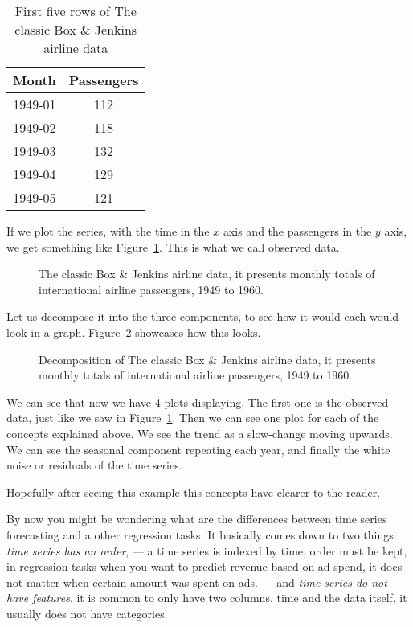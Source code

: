 \documentclass[journal]{IEEEtran}
\begin{document}
\begin{table}[htbp]
  \centering
  \caption{First five rows of The classic Box \& Jenkins airline data}
  \label{tab:passengerdata}
  \begin{tabular}{|c|c|}
    \hline
    Month    & Passengers \\
    \hline
    1949-01  & 112        \\
    1949-02  & 118        \\
    1949-03  & 132        \\
    1949-04  & 129        \\
    1949-05  & 121        \\
    \hline
  \end{tabular}
\end{table}

If we plot the series, with the time in the $x$ axis and the passengers in
the $y$ axis, we get something like Figure~\ref{fig:airpassenger}. This is
what we call observed data.

\begin{figure}[htbp]
  \centering
  
  \caption{The classic Box \& Jenkins airline data, it presents monthly
    totals of international airline passengers, 1949 to 1960.}
  \label{fig:airpassenger}
\end{figure}

Let us decompose it into the three components, to see how it would each would
look in a graph. Figure~\ref{fig:decompose} showcases how this looks.

\begin{figure}[htbp]
  \centering
  
  \caption{Decomposition of The classic Box \& Jenkins airline data, it
    presents monthly totals of international airline passengers, 1949 to
    1960.}
  \label{fig:decompose}
\end{figure}

We can see that now we have 4 plots displaying. The first one is the observed
data, just like we saw in Figure~\ref{fig:airpassenger}. Then we can see one
plot for each of the concepts explained above. We see the trend  as a
slow-change moving upwards. We can see the seasonal component repeating each
year, and finally the white noise or residuals of the time series.

Hopefully after seeing this example this concepts have clearer to the reader.

By now you might be wondering what are the differences between time series
forecasting and a other regression tasks. It basically comes down to two
things: \emph{time series has an order}, --- a time series is indexed by
time, order must be kept, in regression tasks when  you want to predict
revenue based on ad spend, it does not matter when certain amount was spent
on ads. --- and \emph{time series do not have features}, it is common to only
have two columns, time and the data itself, it usually does not have
categories.
\end{document}

